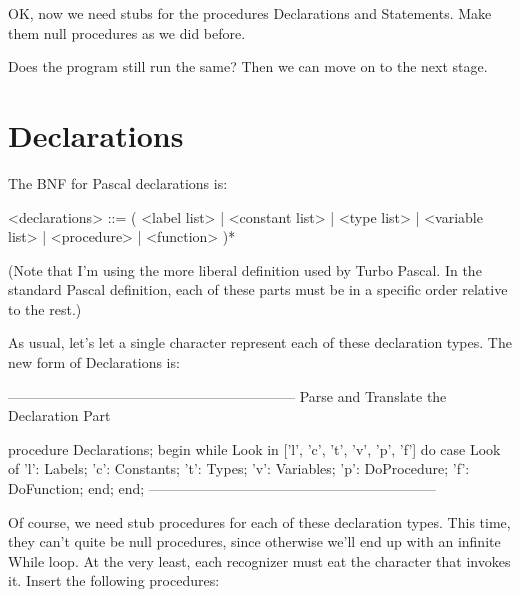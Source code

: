 \documentclass[float=false, crop=false]{standalone}
\begin{document}
OK, now we need stubs for the procedures Declarations and Statements. Make them
null procedures as we did before.

Does the program still run the same? Then we can move on to the next stage.


\section{Declarations}

The BNF for Pascal declarations is:


     <declarations> ::= ( <label list>    |
                          <constant list> |
                          <type list>     |
                          <variable list> |
                          <procedure>     |
                          <function>         )*


(Note that I'm using the more liberal definition used by Turbo Pascal. In the
standard Pascal definition, each of these parts must be in a specific order
relative to the rest.)

As usual, let's let a single character represent each of these declaration
types. The new form of Declarations is:

\begin{code}
{--------------------------------------------------------------}
{ Parse and Translate the Declaration Part }

procedure Declarations;
begin
   while Look in ['l', 'c', 't', 'v', 'p', 'f'] do
      case Look of
       'l': Labels;
       'c': Constants;
       't': Types;
       'v': Variables;
       'p': DoProcedure;
       'f': DoFunction;
      end;
end;
{--------------------------------------------------------------}
\end{code}

Of course, we need stub procedures for each of these declaration types. This
time, they can't quite be null procedures, since otherwise we'll end up with an
infinite While loop. At the very least, each recognizer must eat the character
that invokes it. Insert the following procedures:
\end{document}
